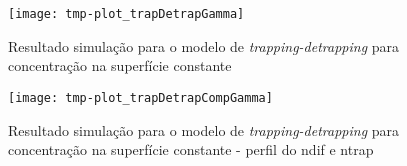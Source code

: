 \begin{figure}[ht]
\centering
	\caption{Resultado simulação para o modelo de \textit{trapping-detrapping} para concentração na superfície constante }
	\texttt{[image: tmp-plot\_trapDetrapGamma]}
	\label{fig:td-cste}
	\centering
\end{figure}


\begin{figure}[ht]
\centering
	\caption{Resultado simulação para o modelo de \textit{trapping-detrapping} para concentração na superfície constante - perfil do ndif e ntrap }
	\texttt{[image: tmp-plot\_trapDetrapCompGamma]}
	\label{fig:td-cscte}
	\centering
\end{figure}